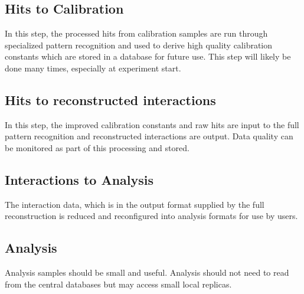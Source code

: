 \subsection{Hits to Calibration}

In this step, the processed hits from calibration samples are run through specialized pattern recognition and used to derive high quality calibration constants which are stored in a database for future use.   This step will likely be done many times, especially at experiment start.

\subsection{Hits to reconstructed interactions }
In this step, the improved calibration constants and raw hits are input to the full  pattern recognition and reconstructed interactions are output. Data quality can be monitored as part of this processing and stored. 

\subsection{Interactions to Analysis}
The interaction data, which is in the output format supplied by the full reconstruction is reduced and reconfigured into analysis formats for use by users. 

\subsection{Analysis}
Analysis samples should be small and useful.  Analysis should not need to read from the central databases but may access small local replicas. 


